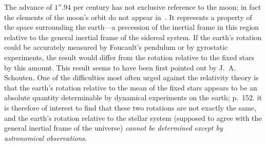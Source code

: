 \documentclass[12pt]{book}
\begin{document}
The advance of $1''.94$ per century has not exclusive reference to the
%
%
%
%
%
%
moon; in fact the elements of the moon's orbit do not appear in~. It
represents a property of the space surrounding the earth---a precession of the
inertial frame in this region relative to the general inertial frame of the sidereal
system. If the earth's rotation could be accurately measured by Foucault's
pendulum or by gyrostatic experiments, the result would differ from the
rotation relative to the fixed stars by this amount. This result seems to have
been first pointed out by J.~A. Schouten. One of the difficulties most often
urged against the relativity theory is that the earth's rotation relative to the
mean of the fixed stars appears to be an absolute quantity determinable by
dynamical experiments on the earth\footnotemark;\footnotetext
  { p.~152.}
it is therefore of interest to find that
these two rotations are not exactly the same, and the earth's rotation relative
to the stellar system (supposed to agree with the general inertial frame of the
universe) \emph{cannot be determined except by astronomical observations}.
\end{document}
